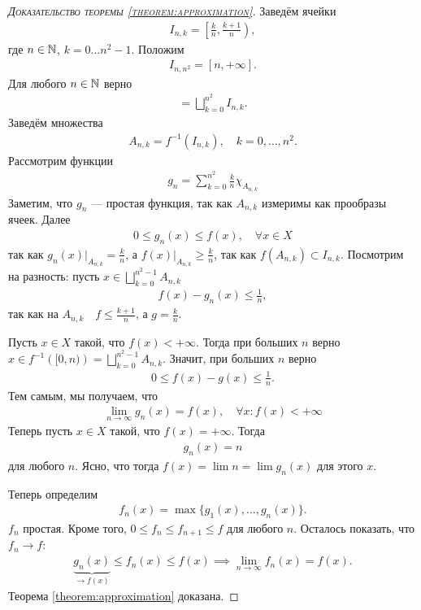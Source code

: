 \begin{proof}[\normalfont\textsc{Доказательство теоремы \ref{theorem:approximation}}]
 Заведём ячейки \begin{align*}
  I_{n,k} = \left[\frac{k}{n}, \frac{k+1}{n}\right)
 ,\end{align*} где $n \in \mathbb{N}$, $k = 0 \ldots n^{2} - 1$. Положим \begin{align*}
 I_{n,n^{2}} = [n, +\infty]
 .\end{align*} Для любого $n \in \mathbb{N}$ верно \begin{align*}
 [0, +\infty] = \bigsqcup_{k=0}^{n^{2}} I_{n,k}
 .\end{align*} Заведём множества \begin{align*}
 A_{n,k} = f^{-1} \left( I_{n,k} \right), \quad k = 0, \ldots, n^{2}
 .\end{align*}
 Рассмотрим функции \begin{align*}
 g_n = \sum_{k=0}^{n^{2}} \frac{k}{n} \chi_{A_{n,k}}
\end{align*}
Заметим, что $g_n$ --- простая функция, так как $A_{n,k}$ измеримы как прообразы ячеек. Далее  \begin{align*}
 0 \leqslant g_n(x) \leqslant f(x), \quad \forall x \in X
 \end{align*} так как $g_n(x) \rvert_{A_{n,k}} = \frac{k}{n}$, а $f(x) \rvert_{A_{n,k}} \geqslant \frac{k}{n}$, так как $f(A_{n,k}) \subset I_{n,k}$.
 Посмотрим на разность: пусть $x \in \bigsqcup_{k=0}^{n^{2} - 1} A_{n,k} $
 \begin{align*}
 f(x) - g_n(x) \leqslant \frac{1}{n}
,\end{align*} так как на $A_{n,k} \quad f \leqslant \frac{k+1}{n}$, а $g  = \frac{k}{n}$.

Пусть $x \in X$ такой, что $f(x) < +\infty$. Тогда при больших $n$ верно $x \in f^{-1} \left( [0, n) \right) = \bigsqcup_{k=0}^{n^{2}-1} A_{n,k} $. Значит, при больших $n$ верно
\begin{align*}
 0 \leqslant f(x) - g(x) \leqslant \frac{1}{n}
.\end{align*} Тем самым, мы получаем, что \begin{align*}
\lim\limits_{n \to \infty} g_n(x) = f(x), \quad \forall x : f(x) < +\infty
\end{align*}
Теперь пусть $x \in X$ такой, что $f(x) = +\infty$. Тогда  \begin{align*}
 g_n(x) = n
\end{align*} для любого $n$. Ясно, что тогда $f(x) = \lim n = \lim g_n(x)$ для этого $x$.

Теперь определим \begin{align*}
 f_n(x) = \max\{g_1(x), \ldots, g_n(x)\}
.\end{align*} $f_n$ простая. Кроме того, $0 \leqslant f_n \leqslant f_{n+1} \leqslant f$ для любого $n$. Осталось показать, что $f_n \to f$: \begin{align*}
\underbrace{g_n(x)}_{\to f(x)} \leqslant f_n(x) \leqslant f(x) \implies \lim\limits_{n \to \infty} f_n(x) = f(x)
.\end{align*} Теорема \ref{theorem:approximation} доказана.
\end{proof}
